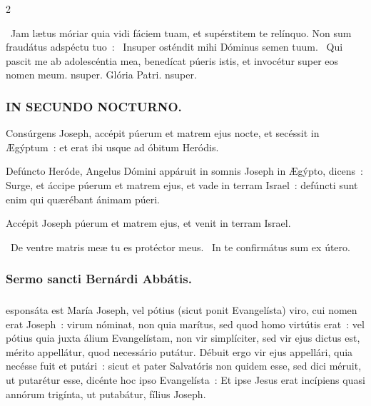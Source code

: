 \documentclass[9pt,twoside]{extarticle}
\begin{document}
\begin{multicols}{2}
{\begin{tightlist}{}
\item {}~Jam lætus móriar quia vidi fáciem tuam, et supérstitem te relínquo. Non sum fraudátus adspéctu tuo~: \textred{*}~Insuper osténdit mihi Dóminus semen tuum. ~Qui pascit me ab adolescéntia mea, benedícat púeris istis, et invocétur super eos nomen meum. nsuper. Glória Patri. nsuper.
\end{tightlist}

\subsubsection*{\center \textsc{IN SECUNDO NOCTURNO.}}
\begin{tightlist}{}
\item {} Consúrgens Joseph, accépit púerum et matrem ejus nocte, et secéssit in Ægýptum~: et erat ibi usque ad óbitum Heródis.
\item {} Defúncto Heróde, Angelus Dómini appáruit in somnis Joseph in Ægýpto, dicens~: Surge, et áccipe púerum et matrem ejus, et vade in terram Israel~: defúncti sunt enim qui quærébant ánimam púeri.
\item {} Accépit Joseph púerum et matrem ejus, et venit in terram Israel.
\item {}~De ventre matris meæ tu es protéctor meus. ~In te confirmátus sum ex útero.
\end{tightlist}

\subsubsection*{\center Sermo sancti Bernárdi Abbátis.}
\subsubsection*{\center {}}
esponsáta est María Joseph, vel pótius (sicut ponit Evangelísta) viro, cui nomen erat Joseph~: virum nóminat, non quia marítus, sed quod homo virtútis erat~: vel pótius quia juxta álium Evangelístam, non vir simplíciter, sed vir ejus dictus est, mérito appellátur, quod necessário putátur. Débuit ergo vir ejus appellári, quia necésse fuit et putári~: sicut et pater Salvatóris non quidem esse, sed dici méruit, ut putarétur esse, dicénte hoc ipso Evangelísta~: Et ipse Jesus erat incípiens quasi annórum trigínta, ut putabátur, fílius Joseph.

}
\end{multicols}
\end{document}
